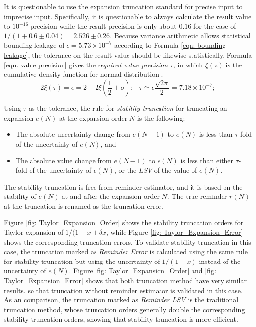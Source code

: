 \documentclass[twoside]{article}
\numberwithin{equation}{section}
\newcommand{\eqspace}{\;\;\;}
\begin{document}
It is questionable to use the expansion truncation standard for precise input to imprecise input.
Specifically, it is questionable to always calculate the result value to $10^{-16}$ precision while the result precision is only about $0.16$ for the case of $1/(1 + 0.6 \pm 0.04)=2.526 \pm 0.26$.
Because variance arithmetic allows statistical bounding leakage of $\epsilon = 5.73 \times 10^{-7}$ according to Formula \eqref{eqn: bounding leakage}, the tolerance on the result value should be likewise statistically.
Formula \eqref{eqn: value precision} gives the \emph{required value precision} $\tau$, in which $\xi(z)$ is the cumulative density function for normal distribution \cite{Probability_Statistics}.
\begin{equation}
\label{eqn: value precision}
2 \xi(\tau) = \epsilon = 2 - 2 \xi(\frac{1}{2} + \sigma):\eqspace \tau \simeq \epsilon \frac{\sqrt{2 \pi}}{2} = 7.18\times 10^{-7};
\end{equation}

Using $\tau$ as the tolerance, the rule for \emph{stability truncation} for truncating an expansion $e(N)$ at the expansion order $N$ is the following:
\begin{itemize}
\item The absolute uncertainty change from $e(N-1)$ to $e(N)$ is less than $\tau$-fold of the uncertainty of $e(N)$, and

\item The absolute value change from $e(N-1)$ to $e(N)$ is less than either $\tau$-fold of the uncertainty of $e(N)$, or the $LSV$ of the value of $e(N)$.

\end{itemize}
The stability truncation is free from reminder estimator, and it is based on the stability of $e(N)$ at and after the expansion order $N$.
The true reminder $r(N)$ at the truncation is renamed as the truncation error.

Figure \ref{fig: Taylor_Expansion_Order} shows the stability truncation orders for Taylor expansion of $1/(1 - x \pm \delta x$, while Figure \ref{fig: Taylor_Expansion_Error} shows the corresponding truncation errors.
To validate stability truncation in this case, the truncation marked as \textit{Reminder Error} is calculated using the same rule for stability truncation but using the uncertainty of $1/(1-x)$ instead of the uncertainty of $e(N)$. 
Figure \ref{fig: Taylor_Expansion_Order} and \ref{fig: Taylor_Expansion_Error} shows that both truncation method have very similar results, so that truncation without reminder estimator is validated in this case.
As an comparison, the truncation marked as \textit{Reminder LSV} is the traditional truncation method, whose truncation orders generally double the corresponding stability truncation orders, showing that stability truncation is more efficient.
\end{document}
